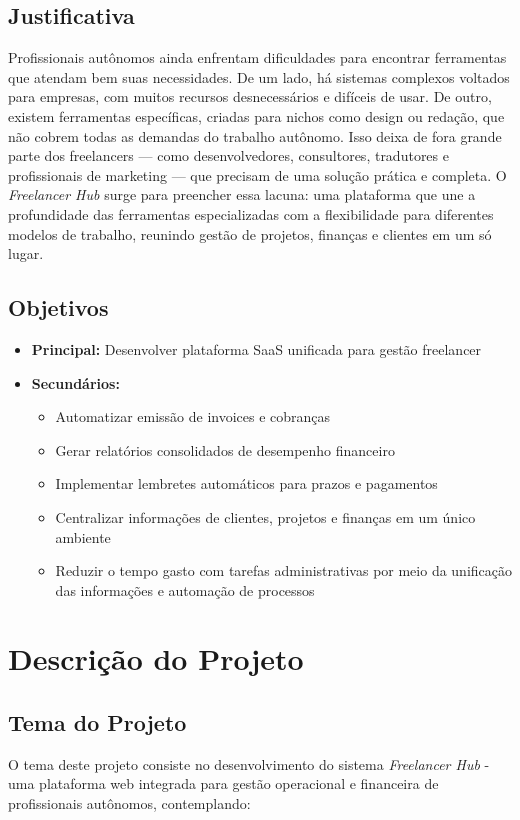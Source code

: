 \documentclass[a4paper,12pt]{article}
\begin{document}
\subsection{Justificativa}
Profissionais autônomos ainda enfrentam dificuldades para encontrar ferramentas que atendam bem suas necessidades. De um lado, há sistemas complexos voltados para empresas, com muitos recursos desnecessários e difíceis de usar. De outro, existem ferramentas específicas, criadas para nichos como design ou redação, que não cobrem todas as demandas do trabalho autônomo. Isso deixa de fora grande parte dos freelancers — como desenvolvedores, consultores, tradutores e profissionais de marketing — que precisam de uma solução prática e completa. O \textit{Freelancer Hub} surge para preencher essa lacuna: uma plataforma que une a profundidade das ferramentas especializadas com a flexibilidade para diferentes modelos de trabalho, reunindo gestão de projetos, finanças e clientes em um só lugar.

\subsection{Objetivos}
\begin{itemize}[nosep]
  \item \textbf{Principal:} Desenvolver plataforma SaaS unificada para gestão freelancer
  \item \textbf{Secundários:}
    \begin{itemize}[nosep]
      \item Automatizar emissão de invoices e cobranças
      \item Gerar relatórios consolidados de desempenho financeiro
      \item Implementar lembretes automáticos para prazos e pagamentos
      \item Centralizar informações de clientes, projetos e finanças em um único ambiente
      \item Reduzir o tempo gasto com tarefas administrativas por meio da unificação das informações e automação de processos
    \end{itemize}
\end{itemize}

\section{Descrição do Projeto}

\subsection{Tema do Projeto}
O tema deste projeto consiste no desenvolvimento do sistema \textit{Freelancer Hub} - uma plataforma web integrada para gestão operacional e financeira de profissionais autônomos, contemplando:
\end{document}
